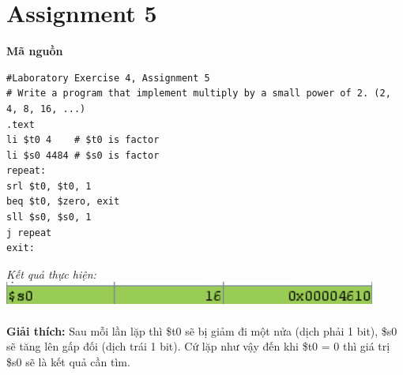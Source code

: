 \documentclass[12pt,a4paper,oneside]{article}
\begin{document}
\pagebreak
\section*{Assignment 5}
\textbf{Mã nguồn}
\begin{lstlisting}
#Laboratory Exercise 4, Assignment 5
# Write a program that implement multiply by a small power of 2. (2, 4, 8, 16, ...)
.text
li $t0 4 	# $t0 is factor
li $s0 4484	# $s0 is factor
repeat:
srl $t0, $t0, 1
beq $t0, $zero, exit
sll $s0, $s0, 1
j repeat
exit:
\end{lstlisting}
\textit{Kết quả thực hiện: \quad \includegraphics[scale=1]{5}}\\\\
\textbf{Giải thích: } Sau mỗi lần lặp thì \$t0 sẽ bị giảm đi một nửa (dịch phải 1 bit), \$s0 sẽ tăng lên gấp đối (dịch trái 1 bit). Cứ lặp như vậy đến khi \$t0 = 0 thì giá trị \$s0 sẽ là kết quả cần tìm.
\end{document}
